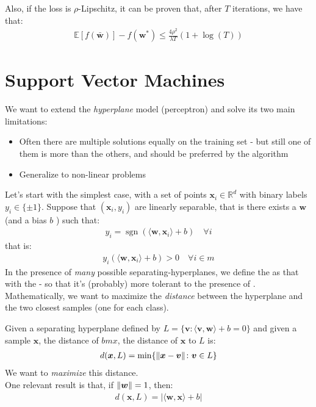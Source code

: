 \documentclass[../template.tex]{subfiles}
\begin{document}
Also, if the loss is $\rho$-Lipschitz, it can be proven that, after $T$ iterations, we have that:
\begin{align*}
    \mathbb{E}[f(\bar{\bm{w}})] - f(\bm{w}^*) \leq \frac{4 \rho^2}{\lambda T} (1+ \log(T)) 
\end{align*} 

\section{Support Vector Machines}
We want to extend the \textit{hyperplane} model (perceptron) and solve its two main limitations:
\begin{itemize}
    \item Often there are multiple solutions equally  on the training set - but still one of them is more  than the others, and should be preferred by the algorithm
    \item Generalize to non-linear problems
\end{itemize}

Let's start with the simplest case, with a set of points $\bm{x}_i \in \mathbb{R}^d$ with binary labels $y_i \in \{\pm 1\}$. Suppose that $(\bm{x}_i, y_i)$ are linearly separable, that is there exists a $\bm{w}$ (and a bias ${b}$ ) such that: 
\begin{align*}
    y_i = \operatorname{sgn} (\langle \bm{w}, \bm{x}_i \rangle + b) \quad \forall i
\end{align*}  
that is:
\begin{align*}
    y_i (\langle \bm{w}, \bm{x}_i \rangle + b) > 0 \quad \forall i \in m
\end{align*}
In the presence of \textit{many} possible separating-hyperplanes, we define the  as that with the  - so that it's (probably) more tolerant to the presence of . Mathematically, we want to maximize the \textit{distance} between the hyperplane and the two closest samples (one for each class).

Given a separating hyperplane defined by $L = \{\bm{v} \colon \langle \bm{v}, \bm{w} \rangle+ b = 0\}$ and given a sample $\bm{x}$, the distance of $bm{x}$, the distance of $\bm{x}$ to $L$ is:
\begin{align*}
    d(\bm{x}, L) = \min\{\norm{\bm{x}-\bm{v}} \colon \bm{v} \in L\}
\end{align*}    
We want to \textit{maximize} this distance.\\

One relevant result is that, if $\norm{\bm{w}} = 1$, then:
\begin{align*}
    d(\bm{x}, L) = |\langle \bm{w}, \bm{x} \rangle + b|
\end{align*} 
 
 
\end{document}
